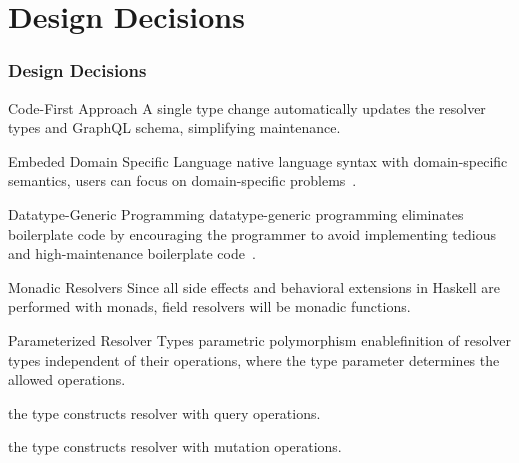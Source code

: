 
\section{Design Decisions} 

\begin{frame}[allowframebreaks]\frametitle{Design Decisions}
\begin{block}{Code-First Approach}  
A single type change automatically updates the resolver types and GraphQL schema, simplifying maintenance. 
\end{block}

\begin{block}{Embeded Domain Specific Language}
native language syntax with domain-specific semantics, users can focus on domain-specific problems~\cite{edsl-modeling}.
\end{block}

\begin{block}{Datatype-Generic Programming}  
datatype-generic programming eliminates boilerplate code by encouraging the programmer to avoid implementing tedious and high-maintenance boilerplate code~\cite{scrap-your-boilerplate}.
\end{block}

\begin{block}{Monadic Resolvers} 
Since all side effects and behavioral extensions in Haskell are performed with monads, field resolvers will be monadic functions. 
\end{block}


\begin{block}{Parameterized Resolver Types}
parametric polymorphism enablefinition of resolver types independent of their operations, where the type parameter determines the allowed operations.  


the type  constructs resolver  with query operations. 
 
the type  constructs resolver  with mutation operations.

\end{block}
\end{frame}